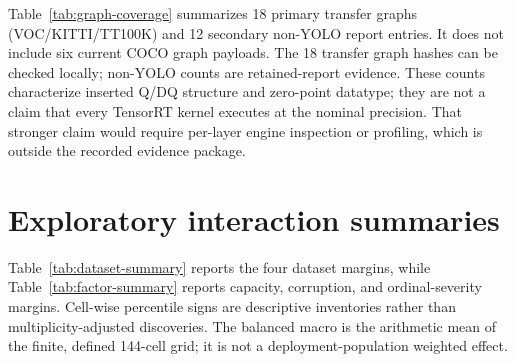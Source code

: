 \documentclass[10pt]{article}
\newcommand{\DeltaPsi}{\Delta\Psi}
\begin{document}
\begin{table}[htbp]
\centering\small
\caption{Initial compact-inventory verification scope, superseded for holdout bindings by the subsequent full recovery described above. Local byte checks do not imply public engine availability or runtime-kernel precision verification.}
\label{tab:treatment-verification}

\end{table}

Table~\ref{tab:graph-coverage} summarizes 18 primary transfer graphs (VOC/KITTI/TT100K) and 12 secondary non-YOLO report entries. It does not include six current COCO graph payloads. The 18 transfer graph hashes can be checked locally; non-YOLO counts are retained-report evidence. These
counts characterize inserted Q/DQ structure and zero-point datatype; they are
not a claim that every TensorRT kernel executes at the nominal precision. That
stronger claim would require per-layer engine inspection or profiling, which is
outside the recorded evidence package.

\begin{table}[htbp]
\centering
\caption{Graph-level Q/DQ coverage for three transfer datasets, excluding COCO.
Ranges reflect the three dataset-specific graphs for each row.}
\label{tab:graph-coverage}
\scriptsize
\resizebox{\textwidth}{!}{}
\end{table}

\FloatBarrier

\section{Exploratory interaction summaries}

Table~\ref{tab:dataset-summary} reports the four dataset margins, while
Table~\ref{tab:factor-summary} reports capacity, corruption, and ordinal-severity
margins. Cell-wise percentile signs are descriptive inventories rather than
multiplicity-adjusted discoveries. The balanced macro is the arithmetic mean of
the finite, defined 144-cell grid; it is not a deployment-population
weighted effect.

\begin{table}[htbp]
\centering
\caption{Dataset-level direct interaction summaries. TT100K's $\DeltaPsi$ uses
the height endpoint; the other rows use the area endpoint.}
\label{tab:dataset-summary}
\small
\resizebox{0.88\textwidth}{!}{}
\end{table}
\end{document}
